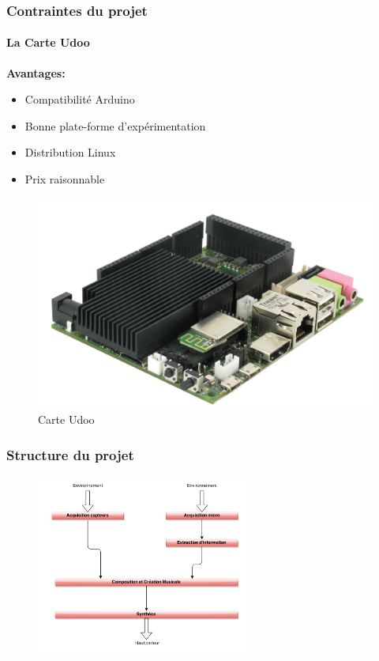 \documentclass{beamer}
\begin{document}
\begin{frame}
\frametitle{Contraintes du projet}
\framesubtitle{La Carte Udoo}
\begin{minipage}{0.49\textwidth}
\textbf{Avantages:}
\begin{itemize}
\item Compatibilité Arduino
\item Bonne plate-forme d’expérimentation
\item Distribution Linux
\item Prix raisonnable
\end{itemize}
\end{minipage}
\begin{minipage}{0.49\textwidth}
\begin{figure}
  \centering
  \includegraphics[width=\textwidth]{udoo.jpg} 
	\caption{Carte Udoo}
\end{figure}
\end{minipage}
\end{frame}

\begin{frame}
\frametitle{Structure du projet}
\begin{figure}
  \centering
  \includegraphics[height=225px]{structprojet.jpg} 
\end{figure}
\end{frame}
\end{document}
